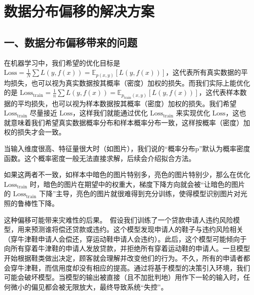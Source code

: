 \clearpage

\hypertarget{ux6570ux636eux5206ux5e03ux504fux79fbux7684ux89e3ux51b3ux65b9ux6848}{%
\section{数据分布偏移的解决方案}\label{ux6570ux636eux5206ux5e03ux504fux79fbux7684ux89e3ux51b3ux65b9ux6848}}

\hypertarget{ux4e00ux6570ux636eux5206ux5e03ux504fux79fbux5e26ux6765ux7684ux95eeux9898}{%
\subsection{一、数据分布偏移带来的问题}\label{ux4e00ux6570ux636eux5206ux5e03ux504fux79fbux5e26ux6765ux7684ux95eeux9898}}

在机器学习中，我们希望的优化目标是 \(\mathrm{Loss}=\frac{1}{N}\sum L(y,f(x))=\mathbb{E}_{p(x,y)}[L(y,f(x))]\)，这代表所有真实数据的平均损失，也可以视为真实数据按其概率（密度）加权的损失。而我们实际上能优化的是 \(\mathrm{Loss}_{\mathrm{train}}=\frac{1}{n}\sum L(y,f(x))=\mathbb{E}_{p_{\mathrm{train}}(x,y)}[L(y,f(x))]\)，这代表样本数据的平均损失，也可以视为样本数据按其概率（密度）加权的损失。我们希望 \(\mathrm{Loss}_{\mathrm{train}}\) 尽量接近 \(\mathrm{Loss}\)，这样我们就能通过优化 \(\mathrm{Loss}_{\mathrm{train}}\) 来实现优化 \(\mathrm{Loss}\)，这也就意味着我们希望真实数据概率分布和样本概率分布一致，这样按概率（密度）加权的损失才会一致。

当输入维度很高、特征量很大时（如图片），我们说的``概率分布p''默认为概率密度函数。这个概率密度一般无法直接求解，后续会介绍拟合方法。

如果这两者不一致，如样本中暗色的图片特别多，亮色的图片特别少，那么在优化 \(\mathrm{Loss}_{\mathrm{train}}\) 时，暗色的图片在期望中的权重大，梯度下降方向就会被``让暗色的图片的 \(\mathrm{Loss}_{\mathrm{train}}\) 下降''主导，亮色的图片就很难得到充分训练，使得模型识别图片对光照的鲁棒性下降。

这种偏移可能带来灾难性的后果。~假设我们训练了一个贷款申请人违约风险模型，用来预测谁将偿还贷款或违约。这个模型发现申请人的鞋子与违约风险相关（穿牛津鞋申请人会偿还，穿运动鞋申请人会违约）。此后，这个模型可能倾向于向所有穿着牛津鞋的申请人发放贷款，并拒绝所有穿着运动鞋的申请人。一旦模型开始根据鞋类做出决定，顾客就会理解并改变他们的行为。不久，所有的申请者都会穿牛津鞋，而信用度却没有相应的提高。通过将基于模型的决策引入环境，我们可能会破坏模型。当模型的输出被直接（且不加批判地）用作下一轮的输入时，任何微小的偏见都会被无限放大，最终导致系统``失控''。

